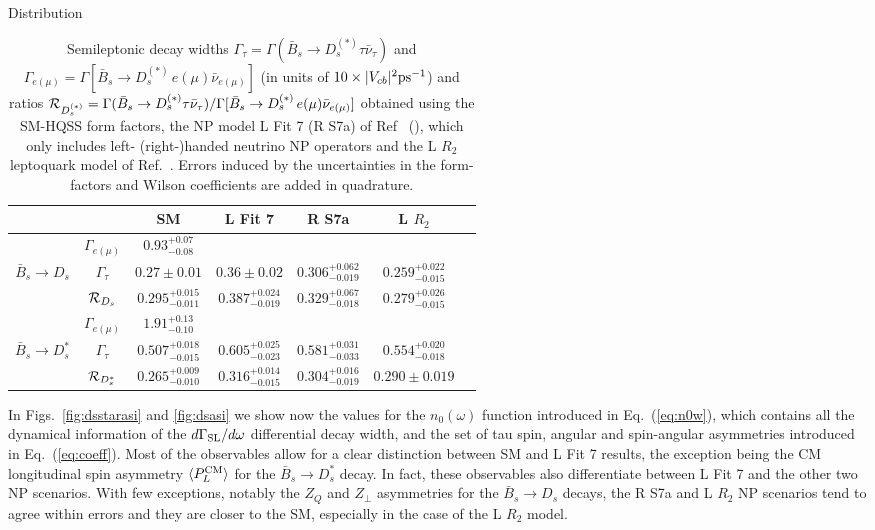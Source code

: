 \documentclass[aps,superscriptaddress,showpacs,nofootinbib,11pt]{revtex4-1}
\newcommand\tstrut{\rule{0pt}{2.9ex}}       %
\begin{document}
%
\begin{table}[h!]
\begin{center}Distribution
\begin{tabular}{c|c|ccccc}\hline\hline
                        &&  SM  & L Fit 7 \cite{Murgui:2019czp}& R S7a 
			\cite{Mandal:2020htr}& L $R_2$ \cite{Shi:2019gxi}
                       \\\hline\tstrut
 &$\Gamma_{e(\mu)}$ & $0.93^{+0.07}_{-0.08}$\\ \tstrut 
$\bar B_s\to D_s$ &$\Gamma_\tau$ &$0.27\pm0.01$ &$0.36\pm0.02$ &$0.306^{+0.062}_{-0.019}$&$0.259^{+0.022}_{-0.015}$\\ \tstrut
& ${\cal R}_{D_s}$ &$0.295^{+0.015}_{-0.011}$&$0.387^{+0.024}_{-0.019}$&$0.329^{+0.067}_{-0.018}$
&$0.279^{+0.026}_{-0.015}$ 
 \\   \hline\tstrut
%
%
%
 &$\Gamma_{e(\mu)}$ & $1.91^{+0.13}_{-0.10}$\\ \tstrut 
$\bar B_s\to D^*_s$ &$\Gamma_\tau$& $0.507^{+0.018}_{-0.015}$&$0.605^{+0.025}_{-0.023}$&$0.581^{+0.031}_{-0.033}$&$0.554^{+0.020}_{-0.018}$\\ \tstrut
& ${\cal R}_{D^*_s}$ &
$0.265^{+0.009}_{-0.010}$&$0.316^{+0.014}_{-0.015}$&$0.304^{+0.016}_{-0.019}$&
$0.290\pm0.019$\\\hline\hline
\end{tabular}
\end{center}
\caption{Semileptonic decay widths $\Gamma_\tau=\Gamma(\bar B_s\to D^{(*)}_s\tau\bar\nu_\tau)$ 
and  $\Gamma_{e(\mu)}=\Gamma[\bar B_s\to D^{(*)}_s\, e(\mu)\bar\nu_{e(\mu)}]$ (in units of  $10\times |V_{cb}|^2 {\rm ps}^{-1}$)
and  ratios ${\cal R}_{D^{(*)}_s} =\Gamma(\bar B_s\to D^{(*)}_s\tau\bar\nu_\tau)
/\Gamma[\bar B_s\to D^{(*)}_s\, e(\mu)\bar\nu_{e(\mu)}]$ 
obtained using the SM-HQSS form factors,  the NP model L Fit 7 (R S7a) of Ref~\cite{Murgui:2019czp} (\cite{Mandal:2020htr}), which only includes left- (right-)handed 
neutrino NP operators and the L $R_2$ leptoquark model of Ref.~\cite{Shi:2019gxi}. Errors induced by the uncertainties in
the form-factors and  Wilson coefficients are added in quadrature.}
\label{tab:ratiosDs}
\end{table}

In Figs.~\ref{fig:dsstarasi} and \ref{fig:dsasi} we show now the values for
the $n_0(\omega)$ function introduced in Eq.~(\ref{eq:n0w}), which contains all the dynamical information of the $d\Gamma_{\rm SL}/d\omega$ differential decay width, and the set of tau spin, angular and spin-angular asymmetries introduced in Eq.~(\ref{eq:coeff}). Most of the observables allow for a clear distinction between SM and L Fit 7 results, the exception being the CM longitudinal spin asymmetry $\langle P_L^{\rm CM}\rangle$ for the $\bar B_s\to D_s^*$ decay. In fact, these observables also differentiate between L Fit 7 and the other two NP scenarios. With few exceptions, notably the $Z_Q$ and $Z_\perp$ asymmetries for the 
$\bar B_s\to D_s$ decays, the R S7a and L $R_2$ NP scenarios tend to agree within errors and they are closer to the SM, especially in the case of the L $R_2$ model.
\end{document}
